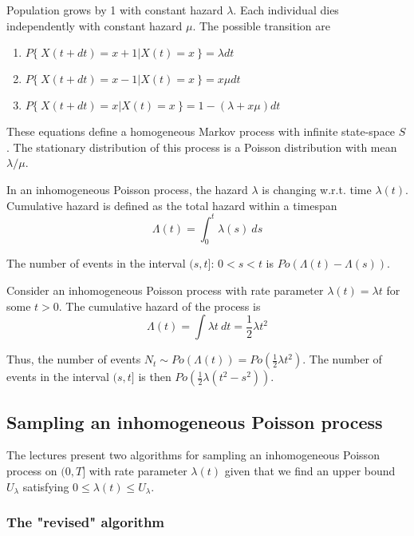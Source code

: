 \documentclass[letterpaper, 12pt]{article}
\newcommand{\myexample}[2]{
    \begin{tcolorbox}[colback=black!5!white,colframe=black,title={Example: #1},
    before skip=12pt]
        #2
    \end{tcolorbox}
}
\newcommand{\1}{\mathds{1}} %
\theoremstyle{definition}
\begin{document}
\vspace{5mm}

\myexample{Immigration-death process}
{
Population grows by 1 with constant hazard $\lambda$. Each individual dies independently with constant hazard $\mu$. The possible transition are
\begin{enumerate}[itemsep=-1pt]
  \item $P\{~X(t + dt) = x+1 | X(t)=x~\} = \lambda dt$
  \item $P\{~X(t + dt) = x-1 | X(t)=x~\} = x\mu dt$
  \item $P\{~X(t + dt) = x | X(t)=x~\} = 1 - (\lambda + x\mu) dt$
\end{enumerate}
These equations define a homogeneous Markov process with infinite state-space $S$. The stationary distribution of this process is a Poisson distribution with mean $\lambda/\mu$.
}

In an inhomogeneous Poisson process, the hazard $\lambda$ is changing w.r.t. time $\lambda(t)$. Cumulative hazard is defined as the total hazard within a timespan
\[
  \Lambda (t) = \int_0^t \lambda(s)~ds
\]

The number of events in the interval $(s, t]$: $0 < s < t$ is $Po(\Lambda(t) - \Lambda(s))$.

\myexample{Inhomogeneous Poisson process}
{

Consider an inhomogeneous Poisson process with rate parameter $\lambda(t) = \lambda t $ for some $t > 0$. The cumulative hazard of the process is
\[
  \Lambda (t) = \int \lambda t~dt = \frac12 \lambda t^2
\]

Thus, the number of events $N_t \sim Po(\Lambda(t)) = Po(\frac12 \lambda t^2)$. The number of events in the interval $(s,t]$ is then $Po(\frac12 \lambda (t^2 - s^2))$.
}

\subsection{Sampling an inhomogeneous Poisson process}

The lectures present two algorithms for sampling an inhomogeneous Poisson process on $(0, T]$ with rate parameter $\lambda(t)$ given that we find an upper bound $U_\lambda$ satisfying $0 \leq \lambda(t) \leq U_\lambda$.

\subsubsection{The "revised" algorithm}
\end{document}
